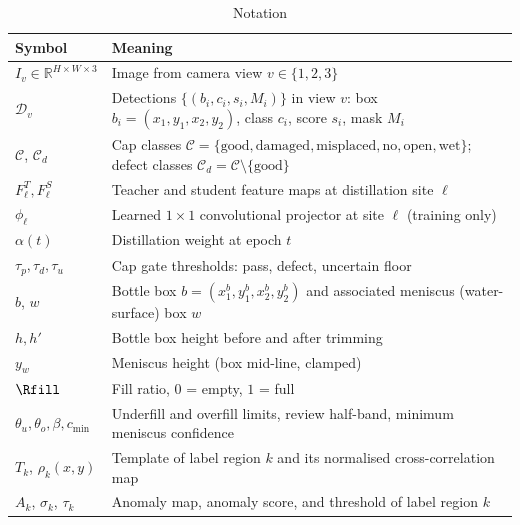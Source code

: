 \begin{table}[htbp]
\centering
\caption{Notation}
\label{tab:notation}
\footnotesize
\begin{tabularx}{\textwidth}{|p{3.4cm}|X|}
\hline
\textbf{Symbol} & \textbf{Meaning} \\ \hline
$I_v \in \mathbb{R}^{H\times W\times 3}$ & Image from camera view $v\in\{1,2,3\}$ \\ \hline
$\mathcal{D}_v$ & Detections $\{(b_i,c_i,s_i,M_i)\}$ in view $v$: box $b_i=(x_1,y_1,x_2,y_2)$, class $c_i$, score $s_i$, mask $M_i$ \\ \hline
$\mathcal{C}$, $\mathcal{C}_d$ & Cap classes $\mathcal{C}=\{\text{good},\text{damaged},\text{misplaced},\text{no},\text{open},\text{wet}\}$; defect classes $\mathcal{C}_d=\mathcal{C}\setminus\{\text{good}\}$ \\ \hline
$F^T_\ell, F^S_\ell$ & Teacher and student feature maps at distillation site $\ell$ \\ \hline
$\phi_\ell$ & Learned $1{\times}1$ convolutional projector at site $\ell$ (training only) \\ \hline
$\alpha(t)$ & Distillation weight at epoch $t$ \\ \hline
$\tau_p,\tau_d,\tau_u$ & Cap gate thresholds: pass, defect, uncertain floor \\ \hline
$b$, $w$ & Bottle box $b=(x^b_1,y^b_1,x^b_2,y^b_2)$ and associated meniscus (water-surface) box $w$ \\ \hline
$h, h'$ & Bottle box height before and after trimming \\ \hline
$y_w$ & Meniscus height (box mid-line, clamped) \\ \hline
$\Rfill$ & Fill ratio, $0$ = empty, $1$ = full \\ \hline
$\theta_u,\theta_o,\beta,c_{\min}$ & Underfill and overfill limits, review half-band, minimum meniscus confidence \\ \hline
$T_k$, $\rho_k(x,y)$ & Template of label region $k$ and its normalised cross-correlation map \\ \hline
$A_k$, $\sigma_k$, $\tau_k$ & Anomaly map, anomaly score, and threshold of label region $k$ \\ \hline
\end{tabularx}
\end{table}

